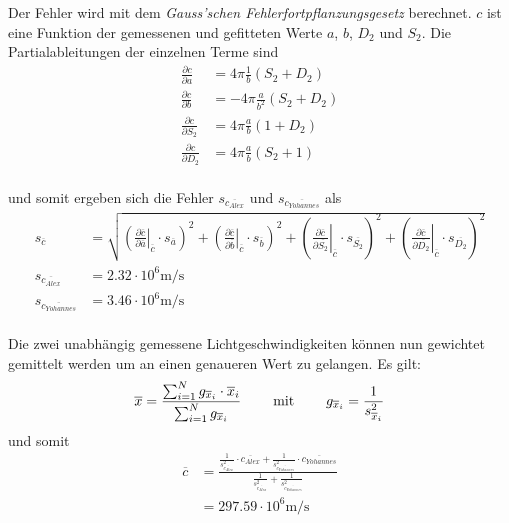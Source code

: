Der Fehler wird mit dem \emph{Gauss'schen Fehlerfortpflanzungsgesetz} berechnet.
$c$ ist eine Funktion  der  gemessenen  und gefitteten Werte $a$, $b$, $D_2$ und
$S_2$. Die Partialableitungen der einzelnen Terme sind
\begin{align*}
    \frac{\partial c}{\partial a}   &= 4\pi\frac{1}{b}(S_2+D_2) \\
    \frac{\partial c}{\partial b}   &= -4\pi\frac{a}{b^2}(S_2+D_2) \\
    \frac{\partial c}{\partial S_2} &= 4\pi\frac{a}{b}(1+D_2) \\
    \frac{\partial c}{\partial D_2} &= 4\pi\frac{a}{b}(S_2+1) \\
\end{align*}

und somit ergeben sich die Fehler $s_{\overline{c_{Alex}}}$ und $s_{\overline{c_{Yohannes}}}$ als
\begin{align*}
    s_{\overline{c}}            &= \sqrt{ \left( \left.\frac{\partial \overline{c}}{\partial \overline{a  }} \right\rvert_{\overline{c}} \cdot s_{\overline{a  }} \right)^2
                                        + \left( \left.\frac{\partial \overline{c}}{\partial \overline{b  }} \right\rvert_{\overline{c}} \cdot s_{\overline{b  }} \right)^2
                                        + \left( \left.\frac{\partial \overline{c}}{\partial \overline{S_2}} \right\rvert_{\overline{c}} \cdot s_{\overline{S_2}} \right)^2
                                        + \left( \left.\frac{\partial \overline{c}}{\partial \overline{D_2}} \right\rvert_{\overline{c}} \cdot s_{\overline{D_2}} \right)^2 } \\
    s_{\overline{c_{Alex}}}     &= 2.32 \cdot 10^6 \textrm{m}/\textrm{s} \\
    s_{\overline{c_{Yohannes}}} &= 3.46 \cdot 10^6 \textrm{m}/\textrm{s} \\
\end{align*}

Die zwei unabh\"angig gemessene Lichtgeschwindigkeiten  k\"onnen  nun  gewichtet
gemittelt  werden   um   an   einen   genaueren   Wert  zu  gelangen.  Es  gilt:
\begin{align*}
    \overline{x} &= \frac{\sum_{i=1}^{N} g_{\overline{x}_i} \cdot \overline{x}_i}{\sum_{i=1}^{N} g_{\overline{x}_i}} \hspace{8mm}\textrm{mit}\hspace{8mm} g_{\overline{x}_i} = \frac{1}{s^2_{\overline{x}_i}} \\
\end{align*}
und somit
\begin{align*}
    \overline{c}  &= \frac{ \frac{1}{s_{\overline{c_{Alex}}}^2} \cdot \overline{c_{Alex}} + \frac{1}{s_{\overline{c_{Yohannes}}}^2} \cdot \overline{c_{Yohannes}} }
                          { \frac{1}{s_{\overline{c_{Alex}}}^2} + \frac{1}{s_{\overline{c_{Yohannes}}}^2} } \\
                  &= 297.59 \cdot 10^6 \textrm{m}/\textrm{s} \\ 
\end{align*}

